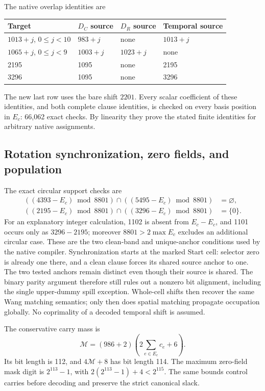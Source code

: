 \documentclass[11pt]{article}
\begin{document}
The native overlap identities are
\begin{center}
\small
\begin{tabular}{@{}llll@{}}
\toprule
Target & $D_C$ source & $D_R$ source & Temporal source\\
\midrule
$1013+j$, $0\le j<10$ & $983+j$ & none & $1013+j$\\
$1065+j$, $0\le j<9$ & $1003+j$ & $1023+j$ & none\\
2195 & 1095 & none & 2195\\
3296 & 1095 & none & 3296\\
\bottomrule
\end{tabular}
\end{center}
The new last row uses the bare shift $2201$. Every scalar coefficient of
these identities, and both complete clause identities, is checked on every
basis position in $E_c$: 66,062 exact checks. By linearity they prove the
stated finite identities for arbitrary native assignments.

\subsection{Rotation synchronization, zero fields, and population}

The exact circular support checks are
\begin{align*}
 ((4393-E_c)\bmod8801)\cap((5495-E_c)\bmod8801)&=\varnothing,\\
 ((2195-E_c)\bmod8801)\cap((3296-E_c)\bmod8801)&=\{0\}.
\end{align*}
For an explanatory integer calculation, 1102 is absent from $E_c-E_c$,
and 1101 occurs only as $3296-2195$; moreover $8801>2\max E_c$ excludes
an additional circular case. These are the two clean-band and unique-anchor
conditions used by the native compiler. Synchronization starts at the
marked Start cell: selector zero is already one there, and a clean clause
forces its shared source anchor to one. The two tested anchors remain
distinct even though their source is shared. The binary parity argument
therefore still rules out a nonzero bit alignment, including the single
upper-dummy spill exception. Whole-cell shifts then recover the same Wang
matching semantics; only then does spatial matching propagate occupation
globally. No coprimality of a decoded temporal shift is assumed.

The conservative carry mass is
\[
 \mathcal M=(986+2)\left(2\sum_{e\in E_c}c_e+6\right).
\]
Its bit length is 112, and $4\mathcal M+8$ has bit length 114.
The maximum zero-field mask digit is $2^{113}-1$, with
$2(2^{113}-1)+4<2^{115}$. The same bounds control carries before decoding
and preserve the strict canonical slack.
\end{document}
